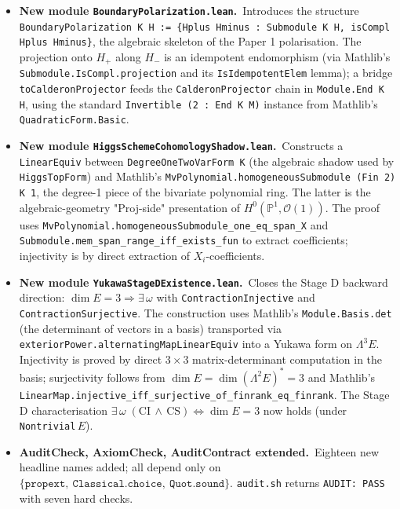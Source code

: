 \documentclass[11pt,a4paper]{article}
\begin{document}
\begin{itemize}[leftmargin=1.6em, itemsep=2pt]
\item \textbf{New module \texttt{BoundaryPolarization.lean}.}\
    Introduces the structure
    \texttt{BoundaryPolarization K H := \{Hplus Hminus :
    Submodule K H, isCompl Hplus Hminus\}}, the algebraic
    skeleton of the Paper 1 polarisation. The projection
    onto $H_+$ along $H_-$ is an idempotent endomorphism
    (via Mathlib's \texttt{Submodule.IsCompl.projection} and
    its \texttt{IsIdempotentElem} lemma); a bridge
    \texttt{toCalderonProjector} feeds the
    \texttt{CalderonProjector} chain in
    \texttt{Module.End K H}, using the standard
    \texttt{Invertible (2 : \texttt{End} K M)} instance from
    Mathlib's \texttt{QuadraticForm.Basic}.

\item \textbf{New module \texttt{HiggsSchemeCohomologyShadow.lean}.}\
    Constructs a \texttt{LinearEquiv} between
    \texttt{DegreeOneTwoVarForm K} (the algebraic shadow used
    by \texttt{HiggsTopForm}) and Mathlib's
    \texttt{MvPolynomial.homogeneousSubmodule (Fin 2) K 1}, the
    degree-1 piece of the bivariate polynomial ring. The latter
    is the algebraic-geometry "Proj-side" presentation of
    $H^0(\mathbb P^1, \mathcal O(1))$. The proof uses
    \texttt{MvPolynomial.homogeneousSubmodule\_one\_eq\_span\_X}
    and \texttt{Submodule.mem\_span\_range\_iff\_exists\_fun}
    to extract coefficients; injectivity is by direct
    extraction of $X_i$-coefficients.

\item \textbf{New module \texttt{YukawaStageDExistence.lean}.}\
    Closes the Stage D backward direction:
    $\dim E = 3 \Rightarrow \exists\,\omega$ with
    \texttt{ContractionInjective} and
    \texttt{ContractionSurjective}. The construction uses
    Mathlib's \texttt{Module.Basis.det} (the determinant of
    vectors in a basis) transported via
    \texttt{exteriorPower.alternatingMapLinearEquiv} into a
    Yukawa form on $\Lambda^3 E$. Injectivity is proved by
    direct $3\times 3$ matrix-determinant computation in
    the basis; surjectivity follows from
    $\dim E = \dim(\Lambda^2 E)^* = 3$ and Mathlib's
    \texttt{LinearMap.injective\_iff\_surjective\_of\_finrank\_eq\_finrank}.
    The Stage D characterisation
    $\exists\,\omega\;(\textrm{CI}\,\wedge\,\textrm{CS})
      \iff \dim E = 3$ now holds (under
    \texttt{Nontrivial}\,$E$).

\item \textbf{AuditCheck, AxiomCheck, AuditContract extended.}\
    Eighteen new headline names added; all depend only on
    $\{\texttt{propext},\ \texttt{Classical.choice},\
    \texttt{Quot.sound}\}$. \texttt{audit.sh} returns
    \texttt{AUDIT:\ PASS} with seven hard checks.
\end{itemize}
\end{document}
